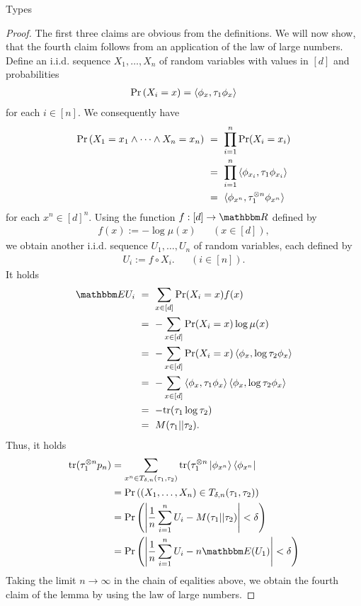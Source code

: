 \begin{subsection}{Types}
 \begin{proof}
  The first three claims are obvious from the definitions. We will now show, that the fourth claim follows from an application of the law of large numbers. Define an 
  i.i.d. sequence 
  $
   X_1,\dots,X_n
  $
  of random variables with values in $[d]$ and probabilities
  \begin{align*}
   \Pr\left(X_i = x\right) = \braket{\phi_x, \tau_1 \phi_x}
  \end{align*}
  for each $i \in [n]$. We consequently have
  \begin{align*}
   \Pr\left(X_1 = x_1 \wedge \cdots \wedge X_n = x_n \right)
    \ &= \ \prod_{i=1}^n \Pr(X_i = x_i) \\
    \ &= \ \prod_{i=1}^n \braket{\phi_{x_i}, \tau_1 \phi_{x_i}} \\
    \ &= \ \braket{\phi_{x^n}, \tau_1^{\otimes n} \phi_{x^n}} 
   \end{align*}
   for each $x^n \in [d]^n$. Using the function $f: [d] \rightarrow \bbmR$ defined by 
   \begin{align*}
    f(x) := - \log \mu(x) &&(x \in [d]),
   \end{align*}
   we obtain another i.i.d. sequence $U_1,\dots,U_n$ of random variables, each defined by
   \begin{align*}
    U_i := f \circ X_i.   &&(i \in [n]).
   \end{align*}
   It holds
   \begin{align*}
    \bbmE U_i 
    \ &= \ \sum_{x \in [d]} \Pr(X_i = x) f(x) \\
    \ &= \ - \sum_{x \in [d]} \Pr(X_i = x) \log \mu (x) \\
    \ &= \ - \sum_{x \in [d]} \Pr(X_i = x) \braket{\phi_x, \log \tau_2 \phi_x} \\
    \ &= \ - \sum_{x \in [d]} \braket{\phi_x, \tau_1 \phi_x} \braket{\phi_x, \log \tau_2 \phi_x} \\
    \ &= \ - \tr(\tau_1 \log \tau_2)  \\
    \ &= \ M(\tau_1||\tau_2).
   \end{align*}
   Thus, it holds
   \begin{align*}
    \tr(\tau_1^{\otimes n} p_n) 
    &= \sum_{x^n \in T_{\delta,n}(\tau_1,\tau_2)} \tr(\tau_1^{\otimes n} \ket{\phi_{x^n}}\bra{\phi_{x^n}} \\
    &= \Pr\left((X_1,\dots,X_n) \in T_{\delta,n}(\tau_1,\tau_2)\right) \\
    &= \Pr \left(\left|\frac{1}{n} \sum_{i=1}^n U_i - M(\tau_1||\tau_2) \right| < \delta \right) \\
    &= \Pr \left(\left|\frac{1}{n} \sum_{i=1}^n U_i - n\bbmE(U_1) \right| < \delta \right)
   \end{align*}
   Taking the limit $n \rightarrow \infty$ in the chain of eqalities above, we obtain the fourth claim of the lemma by using the law of large numbers. 
 \end{proof}
  \end{subsection}
